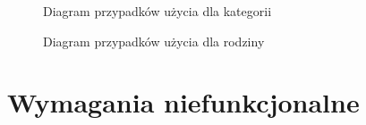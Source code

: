 
\begin{figure}[p]
	\centering
	\caption{Diagram przypadków użycia dla kategorii}
	\label{fig:use-case-category}
\end{figure}

\begin{figure}[p]
	\centering
	\caption{Diagram przypadków użycia dla rodziny}
	\label{fig:use-case-family}
\end{figure}


\section{Wymagania niefunkcjonalne}
\label{sec:wymagania-niefunkcjonalne}

